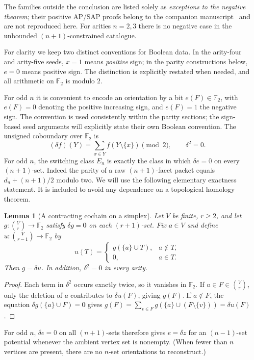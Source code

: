 \documentclass[11pt,a4paper]{article}
\newtheorem{lemma}[theorem]{Lemma}
\theoremstyle{remark}
\newcommand{\F}{\mathbb F_2}
\begin{document}
The families outside the conclusion are listed solely as \emph{exceptions
to the negative theorem}; their positive AP/SAP proofs belong to the
companion manuscript~\cite{catalogue} and are not reproduced here.
For arities $n=2,3$ there is no negative case in the unbounded
$(n+1)$-constrained catalogue.

For clarity we keep two distinct conventions for Boolean data. In the
arity-four and arity-five seeds, $x=1$ means \emph{positive} sign;
in the parity constructions below, $e=0$ means positive sign.
The distinction is explicitly restated when needed, and all arithmetic
on $\mathbb F_2$ is modulo $2$.

For odd $n$ it is convenient to encode an orientation by a bit
$e(F)\in\F$, with $e(F)=0$ denoting the positive increasing sign, and
$e(F)=1$ the negative sign.  The convention is used consistently within
the parity sections; the sign-based seed arguments will explicitly state
their own Boolean convention.  The unsigned coboundary over $\F$ is
\[
 (\delta f)(Y)=\sum_{x\in Y}f(Y\setminus\{x\})\pmod2,
\qquad \delta^2=0.
\]
For odd $n$, the switching class $E_n$ is exactly the class in which
$\delta e=0$ on every $(n+1)$-set.  Indeed the parity of a raw
$(n+1)$-facet packet equals $d_n+(n+1)/2$ modulo two.  We will use the following elementary exactness statement. It is
included to avoid any dependence on a topological homology theorem.

\begin{lemma}[A contracting cochain on a simplex]\label{lem:exactness}
Let $V$ be finite, $r\ge2$, and let
$g:\binom V r\to\mathbb F_2$ satisfy $\delta g=0$ on each
$(r+1)$-set. Fix $a\in V$ and define
$u:\binom V{r-1}\to\mathbb F_2$ by
\[
 u(T)=\begin{cases}g(\{a\}\cup T),&a\notin T,\\0,&a\in T.\end{cases}
\]
Then $g=\delta u$. In addition, $\delta^2=0$ in every arity.
\end{lemma}
\begin{proof}
Each term in $\delta^2$ occurs exactly twice, so it vanishes in
$\mathbb F_2$. If $a\in F\in\binom Vr$, only the deletion of $a$
contributes to $\delta u(F)$, giving $g(F)$. If $a\notin F$,
the equation $\delta g(\{a\}\cup F)=0$ gives
$g(F)=\sum_{v\in F}g(\{a\}\cup(F\setminus\{v\}))=\delta u(F)$.
\end{proof}

For odd $n$, $\delta e=0$ on all $(n+1)$-sets therefore gives
$e=\delta z$ for an $(n-1)$-set potential whenever the ambient
vertex set is nonempty. (When fewer than $n$ vertices are present,
there are no $n$-set orientations to reconstruct.)
\end{document}
